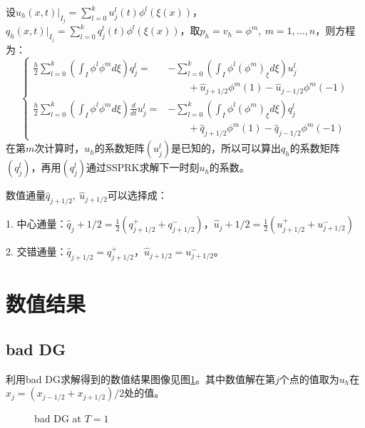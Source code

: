 \documentclass[12pt, a4paper]{ctexart}
\begin{document}
	设$u_h(x,t)|_{I_j} = \sum_{l=0}^k u_j^l(t) \phi^l(\xi(x))$，$q_h(x,t)|_{I_j} = \sum_{l=0}^k q_j^l(t) \phi^l(\xi(x))$，取$p_h = v_h = \phi^m,\  m = 1, \dots,n$，则方程为：
	\begin{equation*}
	\begin{cases}
	\frac{h}{2}\sum_{l=0}^k (\int_{I}\phi^l \phi^m d\xi) q_j^l = & - \sum_{l=0}^k (\int_I \phi^l (\phi^m)_{\xi} d\xi) u_j^l \\
		& \qquad + \hat{u}_{j+1/2} \phi^m(1) - \hat{u}_{j-1/2} \phi^m(-1)\\
	\frac{h}{2} \sum_{l=0}^k (\int_I \phi^l \phi^m d\xi) \frac{d}{dt}u_j^l = & - \sum_{l=0}^k (\int_I \phi^l (\phi^m)_{\xi} d\xi) q_j^l \\
		& \qquad + \hat{q}_{j+1/2} \phi^m(1) - \hat{q}_{j-1/2} \phi^m(-1)
	\end{cases}
	\end{equation*}
	在第$m$次计算时，$u_h$的系数矩阵$(u_j^l)$是已知的，所以可以算出$q_h$的系数矩阵$(q_j^l)$，再用$(q_j^l)$通过SSPRK求解下一时刻$u_h$的系数。
	
	数值通量$\hat{q}_{j+1/2}, \  \hat{u}_{j+1/2}$可以选择成：
	
	1. 中心通量：$\hat{q}_j+1/2 = \frac{1}{2} (q_{j+1/2}^+ + q_{j+1/2}^-)$，$\hat{u}_j+1/2 = \frac{1}{2} (u_{j+1/2}^+ + u_{j+1/2}^-)$
	
	2. 交错通量：$\hat{q}_{j+1/2} = q_{j+1/2}^+$，$\hat{u}_{j+1/2} = u_{j+1/2}^-$。
	
	\section{数值结果}
	
	\subsection{bad DG}
	
	利用bad DG求解得到的数值结果图像见图\ref{1}。其中数值解在第$j$个点的值取为$u_h$在$x_j = (x_{j-1/2} + x_{j+1/2})/2$处的值。
	
	\begin{figure}[htbp]
		\centering
		\quad
		\caption{bad DG at $T=1$}
		\label{1}
	\end{figure}
\end{document}
